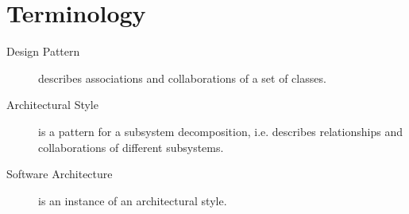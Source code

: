 
\section{Terminology}
\begin{description}

  \item[Design Pattern] describes associations and collaborations of a set of classes.

  \item[Architectural Style] is a pattern for a subsystem decomposition, i.e. describes relationships and collaborations of different subsystems.

  \item[Software Architecture] is an instance of an architectural style.
\end{description}
